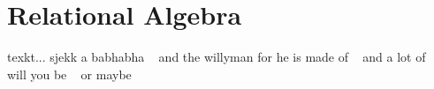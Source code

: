 \section{Relational Algebra}
texkt... sjekk a babhabha ~\cite{gordonRussel} and the willyman for he is made of ~\cite{newYorkDB} and a lot of ~\cite{TDT4225} will you be ~\cite{sudarshan} or maybe ~\cite{makeDiv}